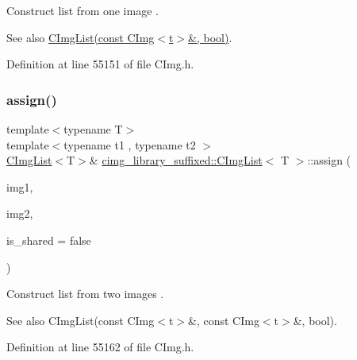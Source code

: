 Construct list from one image . 

\begin{DoxySeeAlso}{See also}
\hyperlink{structcimg__library__suffixed_1_1CImgList_a0e63870941fe962d1be4cd2a5c5e3cd4}{C\+Img\+List(const C\+Img$<$t$>$\&, bool)}. 
\end{DoxySeeAlso}


Definition at line 55151 of file C\+Img.\+h.

\mbox{\label{structcimg__library__suffixed_1_1CImgList_aa8c46892c6e8664f83b3090c4f6525d6}} 
\subsubsection{\texorpdfstring{assign()}{assign()}\hspace{0.1cm}{\footnotesize\ttfamily [9/18]}}
{\footnotesize\ttfamily template$<$typename T$>$ \\
template$<$typename t1 , typename t2 $>$ \\
\hyperlink{structcimg__library__suffixed_1_1CImgList}{C\+Img\+List}$<$T$>$\& \hyperlink{structcimg__library__suffixed_1_1CImgList}{cimg\+\_\+library\+\_\+suffixed\+::\+C\+Img\+List}$<$ T $>$\+::assign (\begin{DoxyParamCaption}\item[{const \hyperlink{structcimg__library__suffixed_1_1CImg}{C\+Img}$<$ t1 $>$ \&}]{img1,  }\item[{const \hyperlink{structcimg__library__suffixed_1_1CImg}{C\+Img}$<$ t2 $>$ \&}]{img2,  }\item[{const bool}]{is\+\_\+shared = {\ttfamily false} }\end{DoxyParamCaption})\hspace{0.3cm}{\ttfamily [inline]}}



Construct list from two images . 

\begin{DoxySeeAlso}{See also}
C\+Img\+List(const C\+Img$<$t$>$\&, const C\+Img$<$t$>$\&, bool). 
\end{DoxySeeAlso}


Definition at line 55162 of file C\+Img.\+h.

